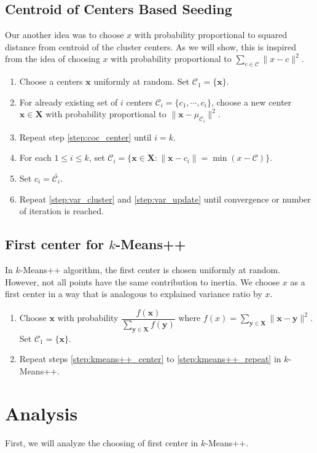 \documentclass[twoside, 11pt]{article}
\newcommand{\x}{\mathbf{x}}
\newcommand{\X}{\mathbf{X}}
\newcommand{\y}{\mathbf{y}}
\newcommand{\C}{\mathcal{C}}
\begin{document}
	\subsection{Centroid of Centers Based Seeding}
	Our another idea was to choose $x$ with probability proportional to squared distance from centroid of the cluster centers. As we will show, this is inspired from the idea of choosing $x$ with probability proportional to $\sum_{c\in\C}\|x-c\|^2$.
		\begin{enumerate}[i]
			\item Choose a centers $\x$ uniformly at random. Set $\C_1=\{\x\}$.
			\item For already existing set of $i$ centers $\mathcal{C}_i=\{c_1,\cdots,c_i\}$, choose a new center $\x\in\X$ with probability proportional to $\|\x-\mu_{\C_i}\|^2$.\label{step:coc_center}
			\item Repeat step \eqref{step:coc_center} until $i=k$.
			\item For each $1\leq i\leq k$, set $\C_i=\{\x\in\X:\|\x-c_i\|=\min(x-\C)\}$.\label{step:coc_cluster}
			\item Set $c_i=\bar{\C_i}$.\label{step:coc_update}
			\item Repeat \eqref{step:var_cluster} and \eqref{step:var_update} until convergence or number of iteration is reached.
		\end{enumerate}
	\subsection{First center for $k$-Means++}
	In $k$-Means++ algorithm, the first center is chosen uniformly at random. However, not all points have the same contribution to inertia. We choose $x$ as a first center in a way that is analogous to explained variance ratio by $x$.
		\begin{enumerate}[i]
			\item Choose $\x$ with probability $\dfrac{f(\x)}{\sum_{\y\in\X}f(\y)}$ where $f(x)=\sum_{\y\in\X}\|\x-\y\|^2$. Set $\C_1=\{\x\}$.
			\item Repeat steps \eqref{step:kmeans++_center} to \eqref{step:kmeans++_repeat} in $k$-Means++.
		\end{enumerate}
	\section{Analysis}
	First, we will analyze the choosing of first center in $k$-Means++. 
\end{document}
